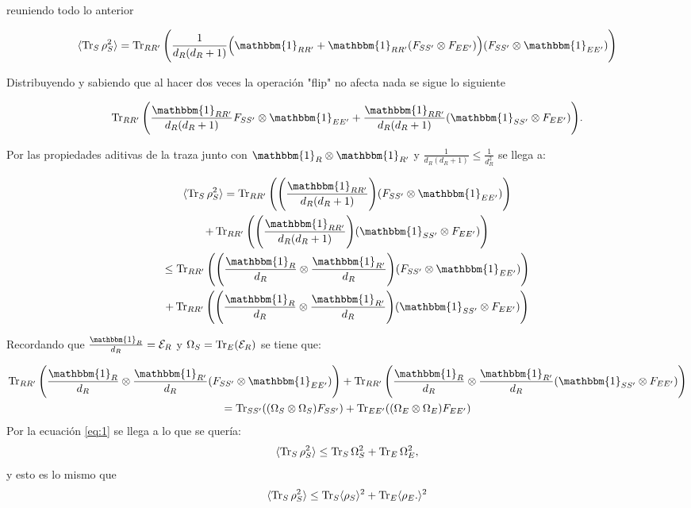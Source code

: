 reuniendo todo lo anterior

\begin{equation}
\langle \Tr_{S} \rho_{S}^2 \rangle = \Tr_{RR'} \Bigg( \frac{1}{d_{R}(d_{R}+1)} \Big( \mathbbm{1}_{RR'}+\mathbbm{1}_{RR'}(F_{SS'} \otimes F_{EE'}) \Big)  (F_{SS'}\otimes \mathbbm{1}_{EE'})   \Bigg)
\end{equation}

Distribuyendo y sabiendo que al hacer dos veces la operación "flip" no afecta nada se sigue lo siguiente

\begin{equation}
\Tr_{RR'} \Bigg( \frac{\mathbbm{1}_{RR'}}{d_{R}(d_{R}+1)} F_{SS'} \otimes \mathbbm{1}_{EE'} + \frac{\mathbbm{1}_{RR'}}{d_{R}(d_{R}+1)} (\mathbbm{1}_{SS'} \otimes F_{EE'})  \Bigg).
\end{equation}

Por las propiedades aditivas de la traza junto con $\mathbbm{1}_{R} \otimes \mathbbm{1}_{R'}$  y $\frac{1}{d_{R}(d_{R}+1)} \le \frac{1}{d_{R}^{2}}$ se llega a:

\begin{multline}
\langle \Tr_{S} \rho_{S}^2 \rangle= \Tr_{RR'} \Bigg( \Bigg( \frac{\mathbbm{1}_{RR'}}{d_{R}(d_{R}+1)} \Bigg) (F_{SS'} \otimes \mathbbm{1}_{EE'})  \Bigg) \\
+ \Tr_{RR'} \Bigg( \Bigg( \frac{\mathbbm{1}_{RR'}}{d_{R}(d_{R}+1)} \Bigg) (\mathbbm{1}_{SS'} \otimes F_{EE'} )  \Bigg)\\ 
\leq \Tr_{RR'} \Bigg( \Bigg( \frac{\mathbbm{1}_{R}}{d_{R}} \otimes  \frac{\mathbbm{1}_{R'}}{d_{R}}  \Bigg) (F_{SS'} \otimes \mathbbm{1}_{EE'})  \Bigg)\\
+ \Tr_{RR'} \Bigg( \Bigg( \frac{\mathbbm{1}_{R}}{d_{R}} \otimes  \frac{\mathbbm{1}_{R'}}{d_{R}}  \Bigg) (\mathbbm{1}_{SS'} \otimes F_{EE'} )  \Bigg)
\end{multline}

Recordando que $\frac{\mathbbm{1}_{R}}{d_{R}}= \mathcal{E}_{R}$ y $\Omega_{S}=\Tr_{E}(\mathcal{E}_{R})$ se tiene que:

\begin{multline}
\Tr_{RR'}\Bigg(\frac{\mathbbm{1}_{R}}{d_{R}} \otimes \frac{\mathbbm{1}_{R'}}{d_{R}} (F_{SS'} \otimes 		\mathbbm{1}_{EE'}) \Bigg) + \Tr_{RR'}\Bigg(\frac{\mathbbm{1}_{R}}{d_{R}} \otimes \frac{\mathbbm{1}_{R'}}{d_{R}} (\mathbbm{1}_{SS'}\otimes 	F_{EE'}) \Bigg) \notag \\
 = \Tr_{SS'}((\Omega_{S} \otimes \Omega_{S})F_{SS'}) + \Tr_{EE'}((\Omega_{E} \otimes \Omega_{E})F_{EE'})
\end{multline}
Por la ecuación \ref{eq:1} se llega a lo que se quería:	
\begin{equation}
\langle \Tr_{S} \rho_{S}^{2} \rangle \le \Tr_{S} \Omega_{S}^{2} +\Tr_{E} \Omega_{E}^{2},
\end{equation}
y esto es lo mismo que 
\begin{equation}
\langle \Tr_{S} \rho_{S}^{2} \rangle \le \Tr_{S} \langle \rho_{S} \rangle ^{2}  + \Tr_{E} \langle \rho_{E}.\rangle^{2}
\end{equation}

